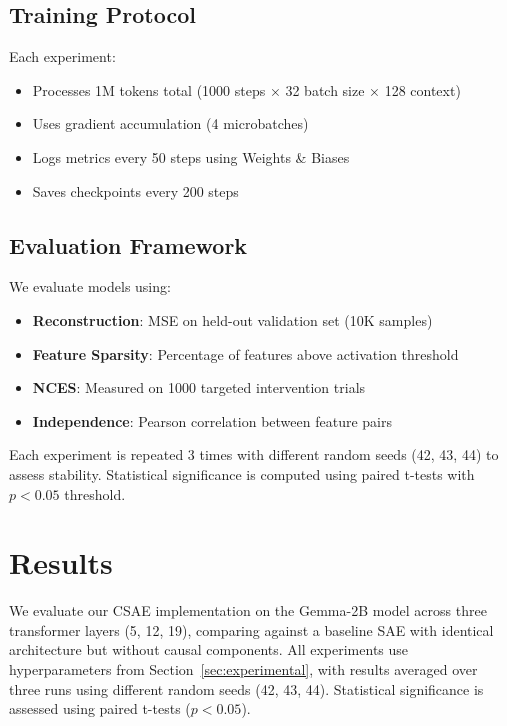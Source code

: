 \documentclass{article} %
\begin{document}
\subsection{Training Protocol}
Each experiment:
\begin{itemize}
    \item Processes 1M tokens total (1000 steps × 32 batch size × 128 context)
    \item Uses gradient accumulation (4 microbatches)
    \item Logs metrics every 50 steps using Weights \& Biases
    \item Saves checkpoints every 200 steps
\end{itemize}

\subsection{Evaluation Framework}
We evaluate models using:
\begin{itemize}
    \item \textbf{Reconstruction}: MSE on held-out validation set (10K samples)
    \item \textbf{Feature Sparsity}: Percentage of features above activation threshold
    \item \textbf{NCES}: Measured on 1000 targeted intervention trials
    \item \textbf{Independence}: Pearson correlation between feature pairs
\end{itemize}

Each experiment is repeated 3 times with different random seeds (42, 43, 44) to assess stability. Statistical significance is computed using paired t-tests with $p < 0.05$ threshold.

\section{Results}
\label{sec:results}

We evaluate our CSAE implementation on the Gemma-2B model across three transformer layers (5, 12, 19), comparing against a baseline SAE with identical architecture but without causal components. All experiments use hyperparameters from Section~\ref{sec:experimental}, with results averaged over three runs using different random seeds (42, 43, 44). Statistical significance is assessed using paired t-tests ($p < 0.05$).
\end{document}
